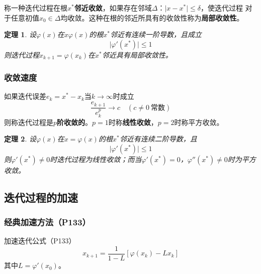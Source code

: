 \documentclass[fontset=ubuntu]{ctexart}
\newtheorem{theorem}{定理}
\numberwithin{equation}{section}
\numberwithin{theorem}{section}
\begin{document}
\begin{multicols}{2}
    称一种迭代过程在根$x^*$\textbf{邻近收敛}，如果存在邻域$\varDelta$：$\lvert x-x^*\rvert\leq\delta$，使迭代过程
    对于任意初值$x_0\in\varDelta$均收敛。这种在根的邻近所具有的收敛性称为\textbf{局部收敛性}。

    \begin{theorem}
        设$\varphi(x)$在$x\varphi(x)$的根$x^*$邻近有连续一阶导数，且成立 \\
        \begin{equation*}
            \lvert\varphi'(x^*)\rvert \leq 1
        \end{equation*}
        则迭代过程$x_{k+1}=\varphi(x_k)$在$x^*$邻近具有局部收敛性。
    \end{theorem}

    \subsubsection{收敛速度}

    如果迭代误差$e_k=x^*-x_k$当$k\rightarrow\infty$时成立
    \begin{equation*}
        \frac{e_{k+1}}{e_k^p}\rightarrow c\quad (c\neq 0\ \text{常数})
    \end{equation*}
    则称迭代过程是\textbf{$p$阶收敛的}。$p=1$时称\textbf{线性收敛}，$p=2$时称平方收敛。

    \begin{theorem}
        设$\varphi(x)$在$x=\varphi(x)$的根$x^*$邻近有连续二阶导数，且 \\
        \begin{equation*}
            \lvert\varphi'(x^*)\rvert \leq 1
        \end{equation*}
        则$\varphi'(x^*)\neq0$时迭代过程为线性收敛；而当$\varphi'(x^*)=0$，$\varphi''(x^*)\neq0$时为平方收敛。
    \end{theorem}

    \subsection{迭代过程的加速}

    \subsubsection{经典加速方法（P133）}

    加速迭代公式（P133）
    \begin{equation}
        x_{k+1}=\frac{1}{1-L}\left[\varphi(x_k)-Lx_k\right]
    \end{equation}
    其中$L=\varphi'(x_0)$。


\end{multicols}
\end{document}
